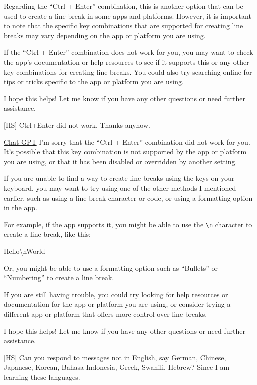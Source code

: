 \documentclass[
]{bxjsbook}
\newenvironment{Shaded}{\begin{snugshade}}{\end{snugshade}}
\newcommand{\NormalTok}[1]{#1}
\theoremstyle{definition}
\theoremstyle{definition}
\theoremstyle{definition}
\theoremstyle{definition}
\theoremstyle{remark}
\begin{document}
Regarding the ``Ctrl + Enter'' combination, this is another option that can be used to create a line break in some apps and platforms. However, it is important to note that the specific key combinations that are supported for creating line breaks may vary depending on the app or platform you are using.

If the ``Ctrl + Enter'' combination does not work for you, you may want to check the app's documentation or help resources to see if it supports this or any other key combinations for creating line breaks. You could also try searching online for tips or tricks specific to the app or platform you are using.

I hope this helps! Let me know if you have any other questions or need further assistance.

{[}HS{]} Ctrl+Enter did not work. Thanks anyhow.

\protect\hyperlink{chatgpt}{Chat GPT} I'm sorry that the ``Ctrl + Enter'' combination did not work for you. It's possible that this key combination is not supported by the app or platform you are using, or that it has been disabled or overridden by another setting.

If you are unable to find a way to create line breaks using the keys on your keyboard, you may want to try using one of the other methods I mentioned earlier, such as using a line break character or code, or using a formatting option in the app.

For example, if the app supports it, you might be able to use the \texttt{\textbackslash{}n} character to create a line break, like this:

\begin{Shaded}
\begin{Highlighting}[]
\NormalTok{Hello\textbackslash{}nWorld}
\end{Highlighting}
\end{Shaded}

Or, you might be able to use a formatting option such as ``Bullets'' or ``Numbering'' to create a line break.

If you are still having trouble, you could try looking for help resources or documentation for the app or platform you are using, or consider trying a different app or platform that offers more control over line breaks.

I hope this helps! Let me know if you have any other questions or need further assistance.

{[}HS{]} Can you respond to messages not in English, say German, Chinese, Japanese, Korean, Bahasa Indonesia, Greek, Swahili, Hebrew? Since I am learning these languages.
\end{document}
